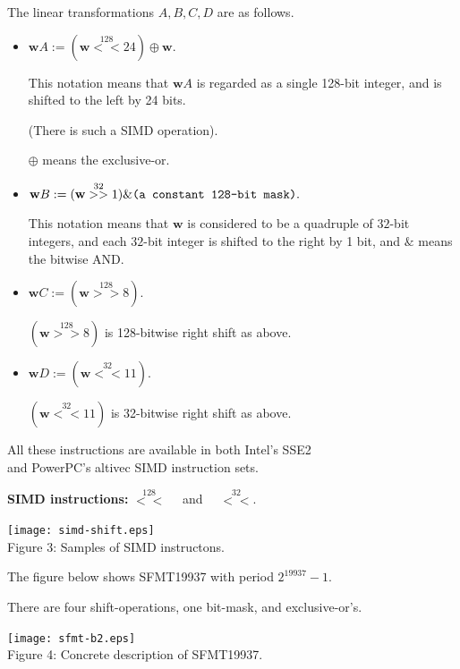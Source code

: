 \documentclass[a4j,12pt,landscape]{jarticle}
\def\bw{{{\mathbf w}}}
\begin{document}
The linear transformations $A,B,C,D$ are as follows.
\begin{itemize}
\item 
$\bw A := (\bw \stackrel{128}{<<} 24) \oplus \bw.$

This notation means that $\bw A$ is regarded
as a single 128-bit integer, and 
is shifted to the left by 24 bits.

(There is such a SIMD operation).

$\oplus$ means the exclusive-or.

\item
$\bw B := (\bw \stackrel{32}{>>} 1) \& \mbox{\tt (a constant 128-bit mask)}.$

This notation means that $\bw$ is considered to be 
a quadruple of $32$-bit integers, and
each $32$-bit integer is shifted to the right by 1 bit,
and $\&$ means the bitwise AND. 

\newpage

\item 
$\bw C := (\bw \stackrel{128}{>>} 8).$

$(\bw \stackrel{128}{>>} 8)$ is 128-bitwise right shift as above.

\item
$\bw D := (\bw \stackrel{32}{<<} 11).$

$(\bw \stackrel{32}{<<} 11)$ is 32-bitwise right shift as above.

\end{itemize}
All these instructions are available in 
both Intel's SSE2 \\
and PowerPC's altivec SIMD instruction sets.

\newpage
{\bf SIMD instructions:} 
$\stackrel{128}{<<}\quad$ and $\quad\stackrel{32}{<<}$.
\begin{center}
\texttt{[image: simd-shift.eps]}
\\
Figure 3: Samples of SIMD instructons.
\end{center}

\newpage
The figure below shows SFMT19937 with period $2^{19937}-1$.

There are four shift-operations, one bit-mask, and exclusive-or's.

\begin{center}
\texttt{[image: sfmt-b2.eps]}
\\
Figure 4: Concrete description of SFMT19937.
\end{center}
\end{document}

